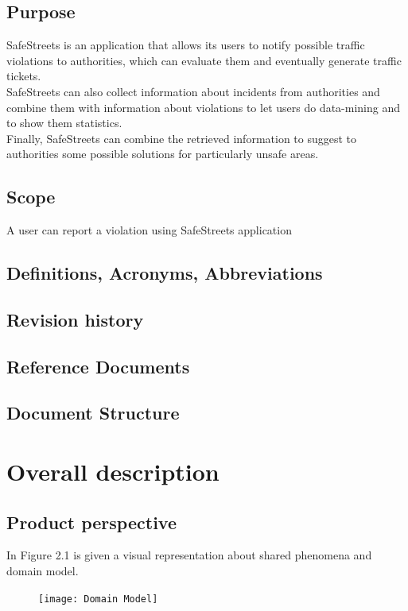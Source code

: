\documentclass{article}
\begin{document}
        \subsection{Purpose}

            SafeStreets is an application that allows its users to notify possible traffic violations to authorities, which can evaluate them and eventually generate traffic tickets.\\
            SafeStreets can also collect information about incidents from authorities and combine them with information about violations to let users do data-mining and to show them statistics.\\
            Finally, SafeStreets can combine the retrieved information to suggest to authorities some possible solutions for particularly unsafe areas.\\
            
        \subsection{Scope}
            A user can report a violation using SafeStreets application
            
        \subsection{Definitions, Acronyms, Abbreviations}
        \subsection{Revision history}
        \subsection{Reference Documents}
        \subsection{Document Structure}
        
        \newpage
        \section{Overall description}
            \subsection{Product perspective}
            In Figure 2.1 is given a visual representation about shared phenomena and domain model. 
    		\begin{figure}[H]
                \centering
                \texttt{[image: Domain Model]}
                \label{fig:domain_model}
    	\end{figure}
    	
\end{document}
